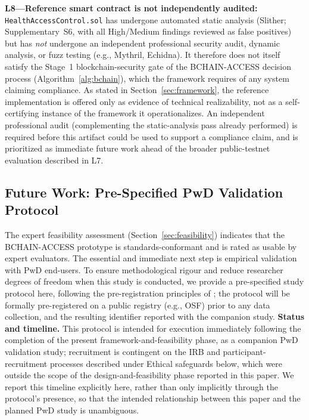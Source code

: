 \documentclass[journal,onecolumn]{IEEEtran}
\begin{document}
\textbf{L8---Reference smart contract is not independently audited:} \texttt{HealthAccessControl.sol} has undergone automated static analysis (Slither; Supplementary~S6, with all High/Medium findings reviewed as false positives) but has \emph{not} undergone an independent professional security audit, dynamic analysis, or fuzz testing (e.g., Mythril, Echidna). It therefore does not itself satisfy the Stage~1 blockchain-security gate of the BCHAIN-ACCESS decision process (Algorithm~\ref{alg:bchain}), which the framework requires of any system claiming compliance. As stated in Section~\ref{sec:framework}, the reference implementation is offered only as evidence of technical realizability, not as a self-certifying instance of the framework it operationalizes. An independent professional audit (complementing the static-analysis pass already performed) is required before this artifact could be used to support a compliance claim, and is prioritized as immediate future work ahead of the broader public-testnet evaluation described in L7.

\subsection{Future Work: Pre-Specified PwD Validation Protocol}
\label{sec:future-work}
\label{sec:pwd-validation}

The expert feasibility assessment (Section~\ref{sec:feasibility}) indicates that the BCHAIN-ACCESS prototype is standards-conformant and is rated as usable by expert evaluators. The essential and immediate next step is empirical validation with PwD end-users. To ensure methodological rigour and reduce researcher degrees of freedom when this study is conducted, we provide a pre-specified study protocol here, following the pre-registration principles of \cite{nosek2018preregistration}; the protocol will be formally pre-registered on a public registry (e.g., OSF) prior to any data collection, and the resulting identifier reported with the companion study. \textbf{Status and timeline.} This protocol is intended for execution immediately following the completion of the present framework-and-feasibility phase, as a companion PwD validation study; recruitment is contingent on the IRB and participant-recruitment processes described under Ethical safeguards below, which were outside the scope of the design-and-feasibility phase reported in this paper. We report this timeline explicitly here, rather than only implicitly through the protocol's presence, so that the intended relationship between this paper and the planned PwD study is unambiguous.
\end{document}
